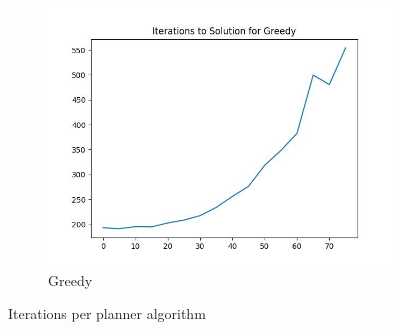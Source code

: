 \documentclass{article}
\begin{document}
\begin{figure}[H]
\begin{subfigure}{0.325\textwidth}
        \includegraphics[width = \textwidth]{plots/Greedy_iterations.jpg}
        \caption{Greedy}
    \end{subfigure}
    \caption{Iterations per planner algorithm}
    \label{fig:iterations-per-planner}
\end{figure}
\end{document}
